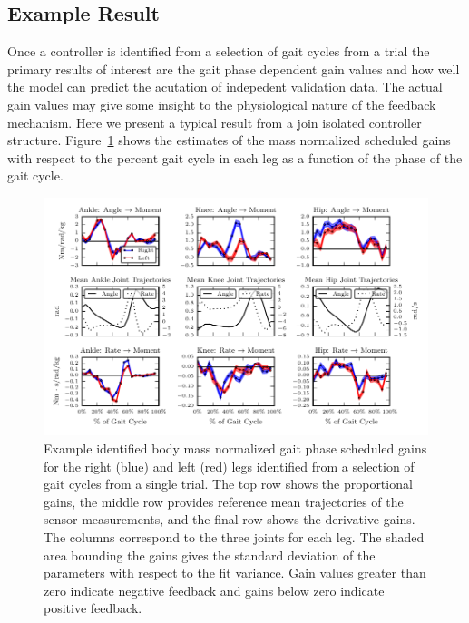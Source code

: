 \documentclass{article}
\begin{document}
\subsection*{Example Result}
%
Once a controller is identified from a selection of gait cycles from a trial
the primary results of interest are the gait phase dependent gain values and
how well the model can predict the acutation of indepedent validation data. The
actual gain values may give some insight to the physiological nature of the
feedback mechanism. Here we present a typical result from a join isolated
controller structure. Figure~\ref{fig:example-gains} shows the estimates of the
mass normalized scheduled gains with respect to the percent gait cycle in each
leg as a function of the phase of the gait cycle.
%
\begin{figure}
  \centering
  \includegraphics{figures/example-identified-joint-isolated-gains.pdf}
  \caption{Example identified body mass normalized gait phase scheduled gains
    for the right (blue) and left (red) legs identified from a selection of
    gait cycles from a single trial. The top row shows the proportional gains,
    the middle row provides reference mean trajectories of the sensor
    measurements, and the final row shows the derivative gains. The columns
    correspond to the three joints for each leg. The shaded area bounding the
    gains gives the standard deviation of the parameters with respect to the
    fit variance. Gain values greater than zero indicate negative feedback and
    gains below zero indicate positive feedback.}
  \label{fig:example-gains}
\end{figure}

\end{document}
